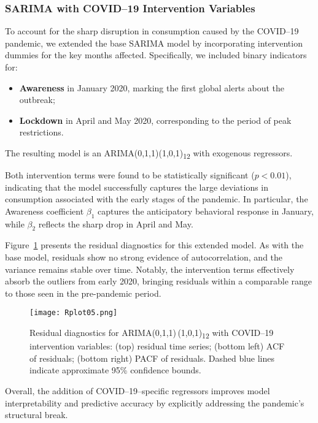 \documentclass[10pt]{article}
\begin{document}
\subsubsection{SARIMA with COVID–19 Intervention Variables}

To account for the sharp disruption in consumption caused by the COVID–19 pandemic, we extended the base SARIMA model by incorporating intervention dummies for the key months affected. Specifically, we included binary indicators for:
\begin{itemize}
    \item \textbf{Awareness} in January 2020, marking the first global alerts about the outbreak;
    \item \textbf{Lockdown} in April and May 2020, corresponding to the period of peak restrictions.
\end{itemize}

The resulting model is an ARIMA(0,1,1)(1,0,1)\textsubscript{12} with exogenous regressors.

Both intervention terms were found to be statistically significant ($p < 0.01$), indicating that the model successfully captures the large deviations in consumption associated with the early stages of the pandemic. In particular, the Awareness coefficient $\beta_1$ captures the anticipatory behavioral response in January, while $\beta_2$ reflects the sharp drop in April and May.

Figure~\ref{fig:sarima_covid} presents the residual diagnostics for this extended model. As with the base model, residuals show no strong evidence of autocorrelation, and the variance remains stable over time. Notably, the intervention terms effectively absorb the outliers from early 2020, bringing residuals within a comparable range to those seen in the pre-pandemic period.

\begin{figure}[ht]
\centering
\texttt{[image: Rplot05.png]}
\caption{Residual diagnostics for ARIMA(0,1,1)\,(1,0,1)\textsubscript{12} with COVID–19 intervention variables: (top) residual time series; (bottom left) ACF of residuals; (bottom right) PACF of residuals. Dashed blue lines indicate approximate 95\% confidence bounds.}
\label{fig:sarima_covid}
\end{figure}

Overall, the addition of COVID–19–specific regressors improves model interpretability and predictive accuracy by explicitly addressing the pandemic's structural break. 
\end{document}
